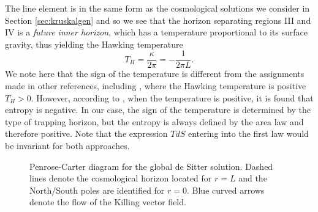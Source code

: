 The line element  is in the same form as the cosmological solutions  we consider in Section \ref{sec:kruskalgen} and so we see that the horizon separating regions III and IV is a \emph{future inner horizon}, which has a temperature proportional to its surface gravity, thus yielding the Hawking temperature
\begin{equation*}
    T_H = \frac{\kappa}{2 \pi} = - \frac{1}{2\pi L}.
\end{equation*}
We note here that the sign of the temperature is different from the assignments made in other references, including \cite{Gibbons:1977mu, spradlin2001les}, where the Hawking temperature is positive $T_H>0$. However, according to \cite{spradlin2001les}, when the temperature is positive, it is found that entropy is negative. In our case, the sign of the temperature is determined by the type of trapping horizon, but the entropy is always defined by the area law and therefore positive. Note that the expression $TdS$ entering into the first law would be invariant for both approaches. 

\begin{figure}[!h]
\centering
{}
\caption[Penrose-Carter diagram for the global de Sitter solution]{Penrose-Carter diagram for the global de Sitter solution. Dashed lines denote the cosmological horizon located for $r = L$ and the North/South poles are identified for $r = 0$. Blue curved arrows denote the flow of the Killing vector field. \label{de_Sitter}}
\end{figure}


